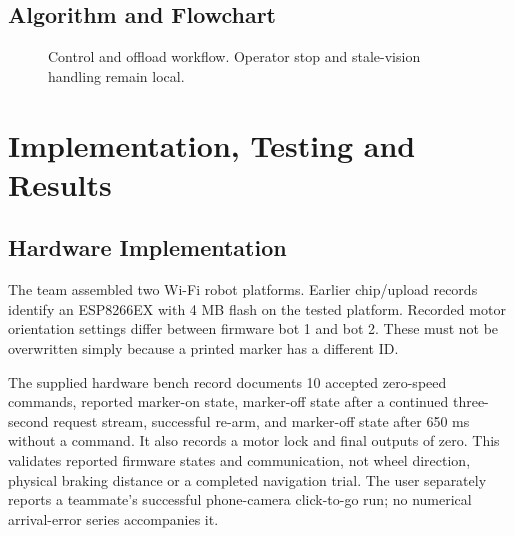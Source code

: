 \documentclass[11pt,a4paper]{article}
\begin{document}
\subsection{Algorithm and Flowchart}
\begin{figure}[ht]\centering
{}
\caption{Control and offload workflow. Operator stop and stale-vision handling remain local.}
\end{figure}

\clearpage\section{Implementation, Testing and Results}
\subsection{Hardware Implementation}
The team assembled two Wi-Fi robot platforms. Earlier chip/upload records identify
an ESP8266EX with 4 MB flash on the tested platform. Recorded motor orientation
settings differ between firmware bot 1 and bot 2. These must not be overwritten
simply because a printed marker has a different ID.

The supplied hardware bench record documents 10 accepted zero-speed commands,
reported marker-on state, marker-off state after a continued three-second request
stream, successful re-arm, and marker-off state after 650 ms without a command.
It also records a motor lock and final outputs of zero. This validates reported
firmware states and communication, not wheel direction, physical braking distance
or a completed navigation trial. The user separately reports a teammate's successful
phone-camera click-to-go run; no numerical arrival-error series accompanies it.
\end{document}
